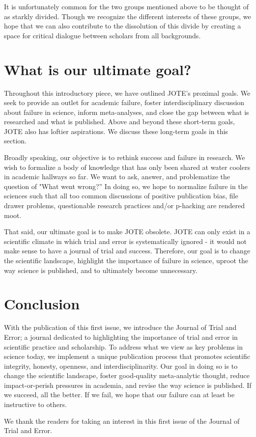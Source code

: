 \documentclass[twocolumn, serif, editorial, authordate]{jote-article}
\begin{document}
It is unfortunately common for the two groups mentioned above to be thought of as starkly divided. Though we recognize the different interests of these groups, we hope that we can also contribute to the dissolution of this divide by creating a space for critical dialogue between scholars from all backgrounds.

 {} \section*{What is our ultimate goal?} 

Throughout this introductory piece, we have outlined JOTE's proximal goals. We seek to provide an outlet for academic failure, foster interdisciplinary discussion about failure in science, inform meta-analyses, and close the gap between what is researched and what is published. Above and beyond these short-term goals, JOTE also has loftier aspirations. We discuss these long-term goals in this section.

Broadly speaking, our objective is to rethink success and failure in research. We wish to formalize a body of knowledge that has only been shared at water coolers in academic hallways so far. We want to ask, answer, and problematize the question of "What went wrong?'' In doing so, we hope to normalize failure in the sciences such that all too common discussions of positive publication bias, file drawer problems, questionable research practices and/or p-hacking are rendered moot.

That said, our ultimate goal is to make JOTE obsolete. JOTE can only exist in a scientific climate in which trial and error is systematically ignored - it would not make sense to have a journal of trial and success. Therefore, our goal is to change the scientific landscape, highlight the importance of failure in science, uproot the way science is published, and to ultimately become unnecessary.


 {} \section*{Conclusion}

With the publication of this first issue, we introduce the Journal of Trial and Error; a journal dedicated to highlighting the importance of trial and error in scientific practice and scholarship. To address what we view as key problems in science today, we implement a unique publication process that promotes scientific integrity, honesty, openness, and interdisciplinarity. Our goal in doing so is to change the scientific landscape, foster good-quality meta-analytic thought, reduce impact-or-perish pressures in academia, and revise the way science is published. If we succeed, all the better. If we fail, we hope that our failure can at least be instructive to others.

We thank the readers for taking an interest in this first issue of the Journal of Trial and Error.

\setlength{\bibhang}{\parindent}
\printbibliography
\end{document}
